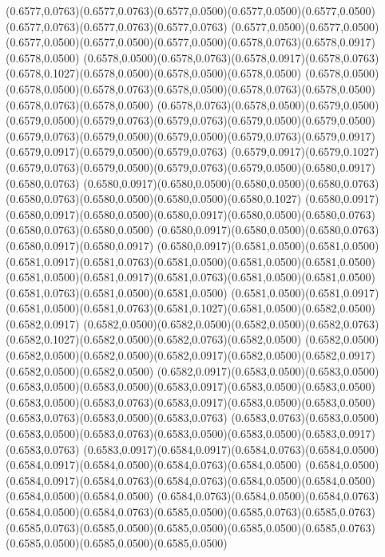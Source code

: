 (0.6577,0.0763)(0.6577,0.0763)(0.6577,0.0500)(0.6577,0.0500)(0.6577,0.0500)(0.6577,0.0763)(0.6577,0.0763)(0.6577,0.0763)
(0.6577,0.0500)(0.6577,0.0500)(0.6577,0.0500)(0.6577,0.0500)(0.6577,0.0500)(0.6578,0.0763)(0.6578,0.0917)(0.6578,0.0500)
(0.6578,0.0500)(0.6578,0.0763)(0.6578,0.0917)(0.6578,0.0763)(0.6578,0.1027)(0.6578,0.0500)(0.6578,0.0500)(0.6578,0.0500)
(0.6578,0.0500)(0.6578,0.0500)(0.6578,0.0763)(0.6578,0.0500)(0.6578,0.0763)(0.6578,0.0500)(0.6578,0.0763)(0.6578,0.0500)
(0.6578,0.0763)(0.6578,0.0500)(0.6579,0.0500)(0.6579,0.0500)(0.6579,0.0763)(0.6579,0.0763)(0.6579,0.0500)(0.6579,0.0500)
(0.6579,0.0763)(0.6579,0.0500)(0.6579,0.0500)(0.6579,0.0763)(0.6579,0.0917)(0.6579,0.0917)(0.6579,0.0500)(0.6579,0.0763)
(0.6579,0.0917)(0.6579,0.1027)(0.6579,0.0763)(0.6579,0.0500)(0.6579,0.0763)(0.6579,0.0500)(0.6580,0.0917)(0.6580,0.0763)
(0.6580,0.0917)(0.6580,0.0500)(0.6580,0.0500)(0.6580,0.0763)(0.6580,0.0763)(0.6580,0.0500)(0.6580,0.0500)(0.6580,0.1027)
(0.6580,0.0917)(0.6580,0.0917)(0.6580,0.0500)(0.6580,0.0917)(0.6580,0.0500)(0.6580,0.0763)(0.6580,0.0763)(0.6580,0.0500)
(0.6580,0.0917)(0.6580,0.0500)(0.6580,0.0763)(0.6580,0.0917)(0.6580,0.0917)
\PST@Solid(0.6580,0.0917)(0.6581,0.0500)(0.6581,0.0500)(0.6581,0.0917)(0.6581,0.0763)(0.6581,0.0500)(0.6581,0.0500)(0.6581,0.0500)
(0.6581,0.0500)(0.6581,0.0917)(0.6581,0.0763)(0.6581,0.0500)(0.6581,0.0500)(0.6581,0.0763)(0.6581,0.0500)(0.6581,0.0500)
(0.6581,0.0500)(0.6581,0.0917)(0.6581,0.0500)(0.6581,0.0763)(0.6581,0.1027)(0.6581,0.0500)(0.6582,0.0500)(0.6582,0.0917)
(0.6582,0.0500)(0.6582,0.0500)(0.6582,0.0500)(0.6582,0.0763)(0.6582,0.1027)(0.6582,0.0500)(0.6582,0.0763)(0.6582,0.0500)
(0.6582,0.0500)(0.6582,0.0500)(0.6582,0.0500)(0.6582,0.0917)(0.6582,0.0500)(0.6582,0.0917)(0.6582,0.0500)(0.6582,0.0500)
(0.6582,0.0917)(0.6583,0.0500)(0.6583,0.0500)(0.6583,0.0500)(0.6583,0.0500)(0.6583,0.0917)(0.6583,0.0500)(0.6583,0.0500)
(0.6583,0.0500)(0.6583,0.0763)(0.6583,0.0917)(0.6583,0.0500)(0.6583,0.0500)(0.6583,0.0763)(0.6583,0.0500)(0.6583,0.0763)
(0.6583,0.0763)(0.6583,0.0500)(0.6583,0.0500)(0.6583,0.0763)(0.6583,0.0500)(0.6583,0.0500)(0.6583,0.0917)(0.6583,0.0763)
(0.6583,0.0917)(0.6584,0.0917)(0.6584,0.0763)(0.6584,0.0500)(0.6584,0.0917)(0.6584,0.0500)(0.6584,0.0763)(0.6584,0.0500)
(0.6584,0.0500)(0.6584,0.0917)(0.6584,0.0763)(0.6584,0.0763)(0.6584,0.0500)(0.6584,0.0500)(0.6584,0.0500)(0.6584,0.0500)
(0.6584,0.0763)(0.6584,0.0500)(0.6584,0.0763)(0.6584,0.0500)(0.6584,0.0763)(0.6585,0.0500)(0.6585,0.0763)(0.6585,0.0763)
(0.6585,0.0763)(0.6585,0.0500)(0.6585,0.0500)(0.6585,0.0500)(0.6585,0.0763)(0.6585,0.0500)(0.6585,0.0500)(0.6585,0.0500)
